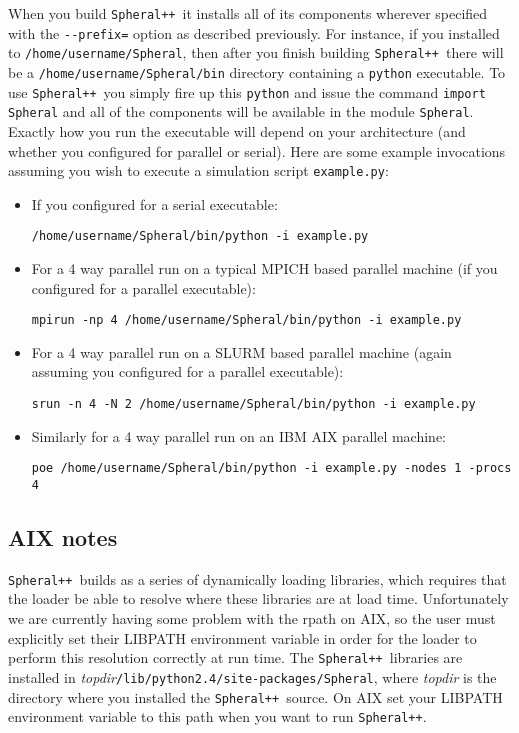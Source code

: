 \documentclass{article}
\newcommand{\Spheral}{{\tt Spheral++}}
\begin{document}
When you build \Spheral\ it installs all of its components wherever specified with the \verb.--prefix=. option as described previously.  For instance, if you installed to \verb+/home/username/Spheral+, then after you finish building \Spheral\ there will be a \verb+/home/username/Spheral/bin+ directory containing a \verb+python+ executable.  To use \Spheral\ you simply fire up this \verb+python+ and issue the command \verb+import Spheral+ and all of the components will be available in the module \verb+Spheral+.  Exactly how you run the executable will depend on your architecture (and whether you configured for parallel or serial).  Here are some example invocations assuming you wish to execute a simulation script \verb+example.py+:
\begin{itemize}
\item If you configured for a serial executable:
\begin{verbatim}
/home/username/Spheral/bin/python -i example.py
\end{verbatim}
\item For a 4 way parallel run on a typical MPICH based parallel machine (if you configured for a parallel executable):
\begin{verbatim}
mpirun -np 4 /home/username/Spheral/bin/python -i example.py
\end{verbatim}
\item For a 4 way parallel run on a SLURM based parallel machine (again assuming you configured for a parallel executable):
\begin{verbatim}
srun -n 4 -N 2 /home/username/Spheral/bin/python -i example.py
\end{verbatim}
\item Similarly for a 4 way parallel run on an IBM AIX parallel machine:
\begin{verbatim}
poe /home/username/Spheral/bin/python -i example.py -nodes 1 -procs 4
\end{verbatim}
\end{itemize}

\subsection{AIX notes}
\Spheral\ builds as a series of dynamically loading libraries, which requires that the loader be able to resolve where these libraries are at load time.  Unfortunately we are currently having some problem with the rpath on AIX, so the user must explicitly set their LIBPATH environment variable in order for the loader to perform this resolution correctly at run time.  The \Spheral\ libraries are installed in {\em topdir}{\tt /lib/python2.4/site-packages/Spheral}, where {\em topdir} is the directory where you installed the \Spheral\ source.  On AIX set your LIBPATH environment variable to this path when you want to run \Spheral.
\end{document}
